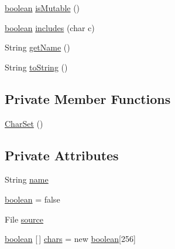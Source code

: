 \begin{DoxyCompactItemize}
\item 
\mbox{\hyperlink{classorg_1_1newdawn_1_1slick_1_1tools_1_1hiero_1_1_char_set_a45913b69f90ce574d65a9023e9d1257c}{boolean}} \mbox{\hyperlink{classorg_1_1newdawn_1_1slick_1_1tools_1_1hiero_1_1_char_set_a341bd96ad632d2be1fc2852acafebf95}{is\+Mutable}} ()
\item 
\mbox{\hyperlink{classorg_1_1newdawn_1_1slick_1_1tools_1_1hiero_1_1_char_set_a45913b69f90ce574d65a9023e9d1257c}{boolean}} \mbox{\hyperlink{classorg_1_1newdawn_1_1slick_1_1tools_1_1hiero_1_1_char_set_ab272036029afe5b828101e7ec0171e51}{includes}} (char c)
\item 
String \mbox{\hyperlink{classorg_1_1newdawn_1_1slick_1_1tools_1_1hiero_1_1_char_set_a32d18b25d24ad48dd49e39254616369f}{get\+Name}} ()
\item 
String \mbox{\hyperlink{classorg_1_1newdawn_1_1slick_1_1tools_1_1hiero_1_1_char_set_a63b12aabf40d0455fbfd17970753af46}{to\+String}} ()
\end{DoxyCompactItemize}
\subsection*{Private Member Functions}
\begin{DoxyCompactItemize}
\item 
\mbox{\hyperlink{classorg_1_1newdawn_1_1slick_1_1tools_1_1hiero_1_1_char_set_a7603834601a4e2d2a861127f64de6ea0}{Char\+Set}} ()
\end{DoxyCompactItemize}
\subsection*{Private Attributes}
\begin{DoxyCompactItemize}
\item 
String \mbox{\hyperlink{classorg_1_1newdawn_1_1slick_1_1tools_1_1hiero_1_1_char_set_aff26a369817bc815327582f0b7ac215e}{name}}
\item 
\mbox{\hyperlink{classorg_1_1newdawn_1_1slick_1_1tools_1_1hiero_1_1_char_set_a45913b69f90ce574d65a9023e9d1257c}{boolean}} = false
\item 
File \mbox{\hyperlink{classorg_1_1newdawn_1_1slick_1_1tools_1_1hiero_1_1_char_set_a82b51d3f0bc57605405fde4608c44520}{source}}
\item 
\mbox{\hyperlink{classorg_1_1newdawn_1_1slick_1_1tools_1_1hiero_1_1_char_set_a45913b69f90ce574d65a9023e9d1257c}{boolean}} \mbox{[}$\,$\mbox{]} \mbox{\hyperlink{classorg_1_1newdawn_1_1slick_1_1tools_1_1hiero_1_1_char_set_abc7c29b42b721d99a1cfc9d2ae97de07}{chars}} = new \mbox{\hyperlink{classorg_1_1newdawn_1_1slick_1_1tools_1_1hiero_1_1_char_set_a45913b69f90ce574d65a9023e9d1257c}{boolean}}\mbox{[}256\mbox{]}
\end{DoxyCompactItemize}


